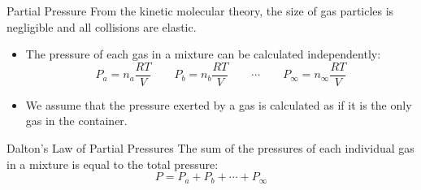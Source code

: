 \documentclass[handout]{beamer}
\begin{document}


\begin{frame}{Partial Pressure}
	From the kinetic molecular theory, the size of gas particles is
	negligible and all collisions are elastic.
	\begin{itemize}
		\item The pressure of each gas in a mixture can be calculated
			independently:
			\begin{equation*}
				P_a = n_a \frac{RT}{V} \qquad P_b = n_b
				\frac{RT}{V} \qquad
				\cdots \qquad P_\infty = n_\infty \frac{RT}{V}
			\end{equation*}
		\item We assume that the pressure exerted by a gas is calculated
			as if it is the only gas in the container.
	\end{itemize}

	\pause

	\bigskip

	\begin{block}{Dalton's Law of Partial Pressures}
		The sum of the pressures of each individual gas in a mixture is
		equal to the total pressure:
		\begin{equation*}
			P = P_a + P_b + \cdots + P_\infty
		\end{equation*}
	\end{block}
\end{frame}
\end{document}
